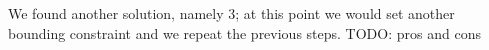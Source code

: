 \documentclass[10pt,a4paper]{article}
\begin{document}

We found another solution, namely 3; at this point we would set another bounding
constraint and we repeat the previous steps. TODO: pros and cons
\end{document}
